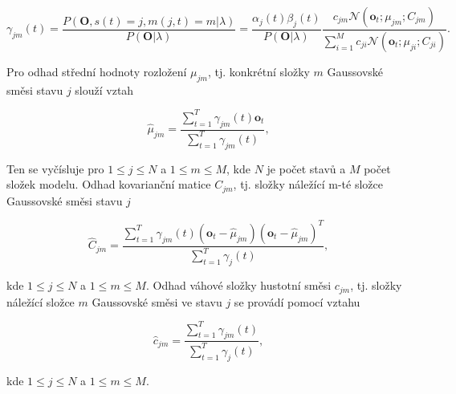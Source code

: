 \begin{equation}
  \gamma_{jm}\left(t\right) = \frac{P\left(\boldsymbol{O}, s\left(t\right)=j, m\left(j,t\right)=m|\lambda\right)}{P\left(\boldsymbol{O}|\lambda\right)} = \frac{\alpha_{j}\left(t\right)\beta_{j}\left(t\right)}{P\left(\boldsymbol{O}|\lambda\right)} \frac{c_{jm}\mathcal{N}\left(\boldsymbol{o}_t;\mu_{jm}; C_{jm}\right)}{\sum_{i=1}^{M} c_{ji} \mathcal{N}\left(\boldsymbol{o}_t;\mu_{ji};C_{ji}\right) }.
  \label{eq:asr:acoustic:structure:gamma:one}
\end{equation}

\noindent Pro odhad střední hodnoty rozložení $\mu_{jm}$, tj. konkrétní složky $m$ Gaussovské směsi stavu $j$ slouží vztah

\begin{equation}
  \hat{\mu}_{jm} = \frac{\sum_{t=1}^{T}\gamma_{jm}\left(t\right)\boldsymbol{o}_t}{\sum_{t=1}^{T}\gamma_{jm}\left(t\right)},
  \label{eq:asr:acoustic:structure:mu}
\end{equation}

\noindent Ten se vyčísluje pro $1 \leq j \leq N$ a $1 \leq m \leq M$, kde $N$ je počet stavů a $M$ počet složek modelu. Odhad kovarianční matice $C_{jm}$, tj. složky náležící m-té složce Gaussovské směsi stavu $j$

\begin{equation}
  \hat{C}_{jm} = \frac{\sum_{t=1}^{T} \gamma_{jm}\left(t\right)\left(\boldsymbol{o}_t - \hat{\mu}_{jm}\right)\left(\boldsymbol{o}_t - \hat{\mu}_{jm}\right)^{T}}{\sum_{t=1}^{T}\gamma_j\left(t\right)},
  \label{eq:asr:acoustic:structure:covariant}
\end{equation}

\noindent kde $1 \leq j \leq N$ a $1 \leq m \leq M$. Odhad váhové složky hustotní směsi $c_{jm}$, tj. složky náležící složce $m$ Gaussovské směsi ve stavu $j$ se provádí pomocí vztahu

\begin{equation}
  \hat{c}_{jm} = \frac{\sum_{t=1}^{T} \gamma_{jm}\left(t\right)}{\sum_{t=1}^{T}\gamma_j\left(t\right)},
  \label{eq:asr:acoustic:structure:weight}
\end{equation}

\noindent kde $1 \leq j \leq N$ a $1 \leq m \leq M$.


